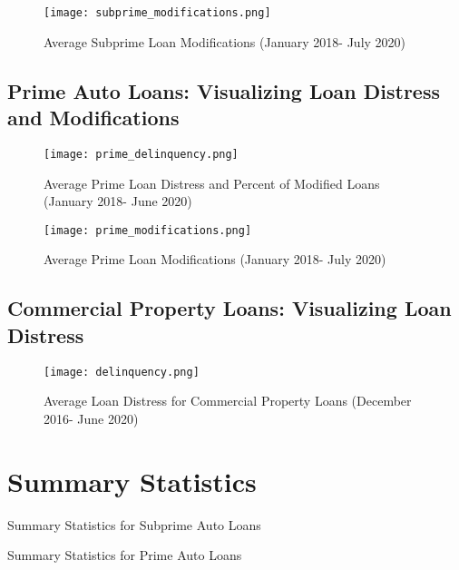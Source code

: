 \documentclass[10.5pt]{article}
\begin{document}
\begin{figure}[H] 
\caption{Average Subprime Loan Modifications (January 2018- July 2020)}
\centering 
\texttt{[image: subprime\_modifications.png]}
\end{figure}

\subsection{Prime Auto Loans: Visualizing Loan Distress and Modifications}

\begin{figure}[H] 
\caption{Average Prime Loan Distress and Percent of Modified Loans (January 2018- June 2020)}
\centering 
\texttt{[image: prime\_delinquency.png]}
\end{figure}

\begin{figure}[H] 
\caption{Average Prime Loan Modifications (January 2018- July 2020)}
\centering 
\texttt{[image: prime\_modifications.png]}
\end{figure}

\newpage
\subsection{Commercial Property Loans: Visualizing Loan Distress}
\begin{figure}[H] 
\caption{Average Loan Distress for Commercial Property Loans (December 2016- June 2020)}
\centering 
\texttt{[image: delinquency.png]}
\end{figure}


\newpage

\section{Summary Statistics}
\begin{table}[H]
    \begin{center}
  \caption{Summary Statistics for Subprime Auto Loans}
    {\renewcommand\normalsize{\small}%
    \small
    }
    \end{center}
\end{table}

\begin{table}[H]
    \begin{center}
  \caption{Summary Statistics for Prime Auto Loans}
    {\renewcommand\normalsize{\small}%
    \small
    }
    \end{center}
\end{table}
\end{document}
